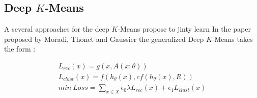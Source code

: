\subsection{Deep $K$-Means}
A several approaches for the deep $K$-Means propose to jinty learn
In the paper proposed by Moradi, Thonet and Gaussier \cite{Deap-K-Means} the
generalized Deep $K$-Means takes the form :

\begin{equation}
  \begin{aligned}
  L_{rec}(x) = g(x, A(x; \theta)) \\
  L_{clust}(x) = f(h_\theta(x), cf(h_\theta(x), R))\\
  min~Loss = \sum_{x \in X} \epsilon_0\lambda L_{rec}(x) + \epsilon_1 L_{clust}
  (x)
  \end{aligned}
\end{equation}
